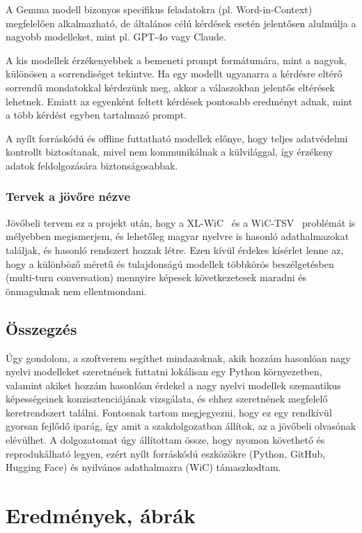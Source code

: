\documentclass[12pt]{report}
\theoremstyle{definition}
\begin{document}
A Gemma modell bizonyos specifikus feladatokra (pl. Word-in-Context) megfelelően alkalmazható, de általános célú kérdések esetén jelentősen alulmúlja a nagyobb modelleket, mint pl. GPT-4o vagy Claude.

A kis modellek érzékenyebbek a bemeneti prompt formátumára, mint a nagyok, különösen a sorrendiséget tekintve. Ha egy modellt ugyanarra a kérdésre eltérő sorrendű mondatokkal kérdezünk meg, akkor a válaszokban jelentős eltérések lehetnek. Emiatt az egyenként feltett kérdések pontosabb eredményt adnak, mint a több kérdést egyben tartalmazó prompt.

A nyílt forráskódú és offline futtatható modellek előnye, hogy teljes adatvédelmi kontrollt biztosítanak, mivel nem kommunikálnak a külvilággal, így érzékeny adatok feldolgozására biztonságosabbak.

\subsection{Tervek a jövőre nézve}
Jövőbeli tervem ez a projekt után, hogy a XL-WiC~\cite{raganato2020xlwic} és a WiC-TSV~\cite{breit2021wictsv} problémát is mélyebben megismerjem, és lehetőleg magyar nyelvre is hasonló adathalmazokat találjak, és hasonló rendszert hozzak létre. Ezen kívül érdekes kísérlet lenne az, hogy a különböző méretű és tulajdonságú modellek többkörös beszélgetésben (multi-turn conversation) mennyire képesek következetesek maradni és önmaguknak nem ellentmondani.


\section{Összegzés}
Úgy gondolom, a szoftverem segíthet mindazoknak, akik hozzám hasonlóan nagy nyelvi modelleket szeretnének futtatni lokálisan egy Python környezetben, valamint akiket hozzám hasonlóan érdekel a nagy nyelvi modellek szemantikus képességeinek konzisztenciájának vizsgálata, és ehhez szeretnének megfelelő keretrendszert találni.
 Fontosnak tartom megjegyezni, hogy ez egy rendkívül gyorsan fejlődő iparág, így amit a szakdolgozatban állítok, az a jövőbeli olvasónak elévülhet.
A dolgozatomat úgy állítottam össze, hogy nyomon követhető és reprodukálható legyen, ezért nyílt forráskódú eszközökre (Python, GitHub, Hugging Face) és nyilvános adathalmazra (WiC) támaszkodtam.

\clearpage

\chapter*{Eredmények, ábrák}
\end{document}
